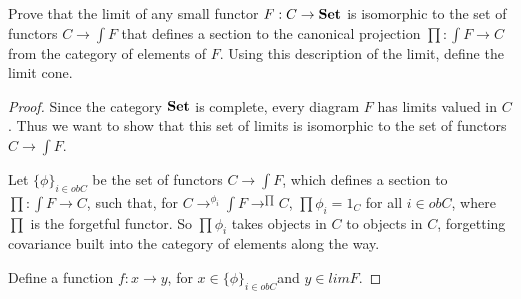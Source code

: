 \documentclass[../../main]{subfiles}
\begin{document}
\begin{lemma}[3.2.vi]
	Prove that the limit of any small functor $F: C \rightarrow \bold{Set}$ is
	isomorphic to the set of functors $C \rightarrow \int F$ that defines a
	section to the canonical projection $ \prod : \int F \rightarrow C$ from the
	category of elements of $F$. Using this description of the limit, define the
	limit cone.
\end{lemma}

\begin{proof}
	Since the category $\bold{Set}$ is complete, every diagram $F$ has limits
	valued in $C$. Thus we want to show that this set of limits is isomorphic to
	the set of functors $C \rightarrow \int F$.

	Let $\{ \phi\} _{i \in obC}$ be the set of functors $C \rightarrow \int F$,
	which defines a section to $ \prod : \int F \rightarrow C$, such that, for
	$C\rightarrow^{\phi_i}\int F \rightarrow^{\prod} C$, $\prod \phi_i = 1_C$
	for all $i \in obC$, where $\prod$ is the forgetful functor. So $\prod
	\phi_i$ takes objects in $C$ to objects in $C$, forgetting covariance built
	into the category of elements along the way.

	Define a function $f: x \rightarrow y$, for $x \in \{ \phi\} _{i \in obC}
	$and $y \in limF$.
\end{proof}
\end{document}
